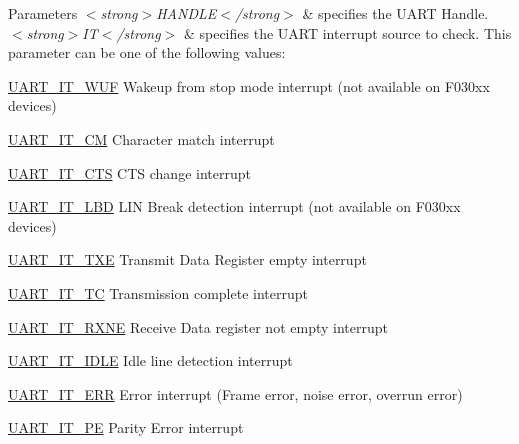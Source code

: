 \begin{DoxyParams}{Parameters}
{\em $<$strong$>$\+H\+A\+N\+D\+L\+E$<$/strong$>$} & specifies the U\+A\+RT Handle. \\
\hline
{\em $<$strong$>$\+I\+T$<$/strong$>$} & specifies the U\+A\+RT interrupt source to check. This parameter can be one of the following values\+: \begin{DoxyItemize}
\item \hyperlink{group___u_a_r_t___interrupt__definition_gab8899f6307781779f65a7c18aabb3204}{U\+A\+R\+T\+\_\+\+I\+T\+\_\+\+W\+UF} Wakeup from stop mode interrupt (not available on F030xx devices) \item \hyperlink{group___u_a_r_t___interrupt__definition_ga4c22e866bce68975a180828012489106}{U\+A\+R\+T\+\_\+\+I\+T\+\_\+\+CM} Character match interrupt \item \hyperlink{group___u_a_r_t___interrupt__definition_ga986d271478550f9afa918262ca642333}{U\+A\+R\+T\+\_\+\+I\+T\+\_\+\+C\+TS} C\+TS change interrupt \item \hyperlink{group___u_a_r_t___interrupt__definition_gabca5e77508dc2dd9aa26fcb683d9b988}{U\+A\+R\+T\+\_\+\+I\+T\+\_\+\+L\+BD} L\+IN Break detection interrupt (not available on F030xx devices) \item \hyperlink{group___u_a_r_t___interrupt__definition_ga552636e2af516d578856f5ee2ba71ed7}{U\+A\+R\+T\+\_\+\+I\+T\+\_\+\+T\+XE} Transmit Data Register empty interrupt \item \hyperlink{group___u_a_r_t___interrupt__definition_gab9a4dc4e8cea354fd60f4117513b2004}{U\+A\+R\+T\+\_\+\+I\+T\+\_\+\+TC} Transmission complete interrupt \item \hyperlink{group___u_a_r_t___interrupt__definition_gac1bedf7a65eb8c3f3c4b52bdb24b139d}{U\+A\+R\+T\+\_\+\+I\+T\+\_\+\+R\+X\+NE} Receive Data register not empty interrupt \item \hyperlink{group___u_a_r_t___interrupt__definition_ga9781808d4f9999061fc2da36572191d9}{U\+A\+R\+T\+\_\+\+I\+T\+\_\+\+I\+D\+LE} Idle line detection interrupt \item \hyperlink{group___u_a_r_t___i_t_ga8eb26d8edd9bf78ae8d3ad87dd51b618}{U\+A\+R\+T\+\_\+\+I\+T\+\_\+\+E\+RR} Error interrupt (Frame error, noise error, overrun error) \item \hyperlink{group___u_a_r_t___interrupt__definition_ga55f922ddcf513509710ade5d7c40a1db}{U\+A\+R\+T\+\_\+\+I\+T\+\_\+\+PE} Parity Error interrupt \end{DoxyItemize}
\\
\hline
\end{DoxyParams}

